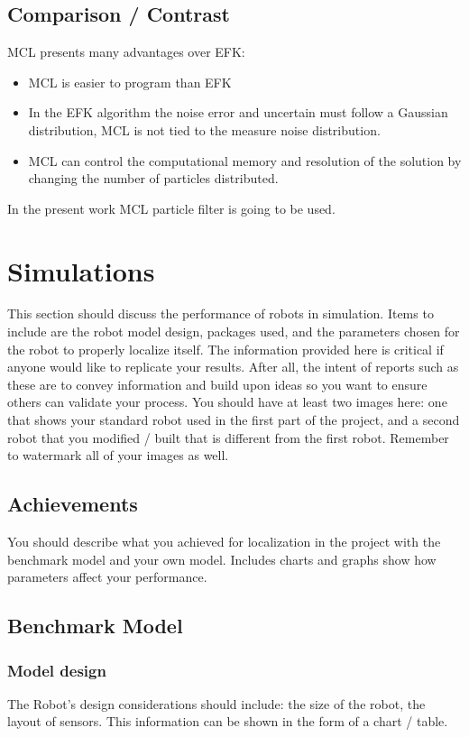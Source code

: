 \documentclass[10pt,journal,compsoc]{IEEEtran}
\begin{document}
\subsection{Comparison / Contrast}

MCL presents many advantages over EFK:

\begin{itemize}
\item MCL is easier to program than EFK 
\item In the EFK algorithm the noise error and uncertain must follow a Gaussian distribution, MCL is not tied to the measure noise distribution.
\item MCL can control the computational memory and resolution of the solution by changing the number of particles distributed.
\end{itemize} 

In the present work MCL particle filter is going to be used.


\section{Simulations}
This section should discuss the performance of robots in simulation. Items to include are the robot model design, packages used, and the parameters chosen for the robot to properly localize itself. The information provided here is critical if anyone would like to replicate your results. After all, the intent of reports such as these are to convey information and build upon ideas so you want to ensure others can validate your process.
You should have at least two images here: one that shows your standard robot used in the first part of the project, and a second robot that you modified / built that is different from the first robot. Remember to watermark all of your images as well. 

\subsection{Achievements}
You should describe what you achieved for localization in the project with the benchmark model and your own model. Includes charts and graphs show how parameters affect your performance. 

\subsection{Benchmark Model}


\subsubsection{Model design}
The Robot's design considerations should include: the size of the robot, the layout of sensors. This information can be shown in the form of a chart / table.
\end{document}

